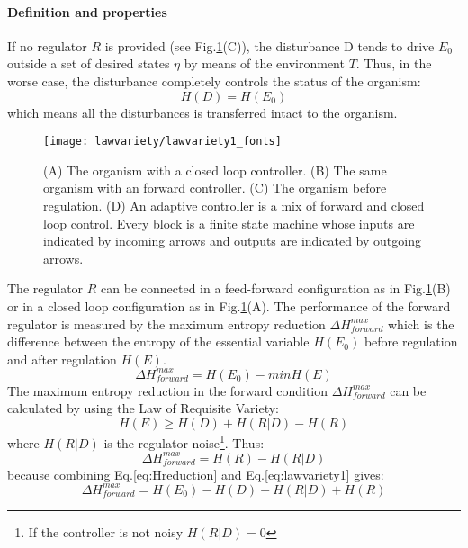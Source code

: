 \paragraph{Definition and properties}
If no regulator $R$ is provided (see Fig.\ref{fig:ashby1}(C)), the disturbance D
tends to drive $E_0$ outside a set of desired states $\eta$ by means of the
environment $T$.
Thus, in the worse case, the disturbance completely controls the status of the organism:
\begin{equation}
H(D)=H(E_0)\label{eq:initial}
\end{equation}
which means all the disturbances is transferred intact to the organism.
\begin{figure}
\begin{center}
\texttt{[image: lawvariety/lawvariety1\_fonts]}
\caption[Law of requisite variety for learning and non learning agents]{(A)
The organism with a closed loop controller. (B) The same organism with an forward
controller. (C) The organism before regulation. (D) An adaptive controller is a
 mix of forward and closed loop control. Every block is a finite state machine
whose inputs are indicated by incoming arrows and outputs are indicated by
outgoing arrows. \label{fig:ashby1}}
\end{center}
\end{figure}
The regulator $R$ can be connected in a feed-forward configuration as in
Fig.\ref{fig:ashby1}(B) or in a closed loop configuration as in Fig.\ref{fig:ashby1}(A).
The performance of the forward regulator is measured by the maximum entropy
reduction $\Delta H^{max}_{forward}$ which is the difference between the entropy
of the essential variable $H(E_0)$ before regulation and after regulation $H(E)$.
\begin{equation}
\Delta H^{max}_{forward}=H(E_0)-min H(E)\label{eq:Hreduction}
\end{equation}
The maximum entropy reduction in the forward condition $\Delta H^{max}_{forward}$
 can be calculated by using the Law of Requisite Variety:
\begin{equation}
H(E)\geq H(D)+H(R|D)-H(R)\label{eq:lawvariety1}
\end{equation}
where $H(R|D)$ is the regulator noise\footnote{If the controller is not noisy $H(R|D)=0$}.
Thus:
\begin{equation}
\Delta H^{max}_{forward}=H(R)-H(R|D)\label{eq.deltaforward}
\end{equation}
because combining Eq.\ref{eq:Hreduction} and Eq.\ref{eq:lawvariety1} gives:
\begin{equation}
\Delta H^{max}_{forward}=H(E_0)-H(D)-H(R|D)+H(R)
\end{equation}
